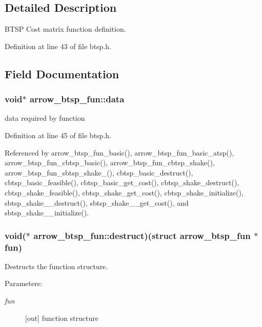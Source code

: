 \subsection{Detailed Description}
BTSP Cost matrix function definition. 

Definition at line 43 of file btsp.h.

\subsection{Field Documentation}
\hypertarget{structarrow__btsp__fun_9c1a276685fb0cac372faef2dd2ba99a}{
\subsubsection[{data}]{\setlength{\rightskip}{0pt plus 5cm}void$\ast$ {\bf arrow\_\-btsp\_\-fun::data}}}
\label{structarrow__btsp__fun_9c1a276685fb0cac372faef2dd2ba99a}


data required by function 

Definition at line 45 of file btsp.h.

Referenced by arrow\_\-btsp\_\-fun\_\-basic(), arrow\_\-btsp\_\-fun\_\-basic\_\-atsp(), arrow\_\-btsp\_\-fun\_\-cbtsp\_\-basic(), arrow\_\-btsp\_\-fun\_\-cbtsp\_\-shake(), arrow\_\-btsp\_\-fun\_\-sbtsp\_\-shake\_(), cbtsp\_\-basic\_\-destruct(), cbtsp\_\-basic\_\-feasible(), cbtsp\_\-basic\_\-get\_\-cost(), cbtsp\_\-shake\_\-destruct(), cbtsp\_\-shake\_\-feasible(), cbtsp\_\-shake\_\-get\_\-cost(), cbtsp\_\-shake\_\-initialize(), sbtsp\_\-shake\_\_\-destruct(), sbtsp\_\-shake\_\_\-get\_\-cost(), and sbtsp\_\-shake\_\_\-initialize().\hypertarget{structarrow__btsp__fun_6c66b7591252728aaa441139c623446a}{
\subsubsection[{destruct}]{\setlength{\rightskip}{0pt plus 5cm}void($\ast$ {\bf arrow\_\-btsp\_\-fun::destruct})(struct {\bf arrow\_\-btsp\_\-fun} $\ast$fun)}}
\label{structarrow__btsp__fun_6c66b7591252728aaa441139c623446a}


Destructs the function structure. 

\begin{Desc}
\item[Parameters:]
\begin{description}
\item[{\em fun}]\mbox{[}out\mbox{]} function structure \end{description}
\end{Desc}


